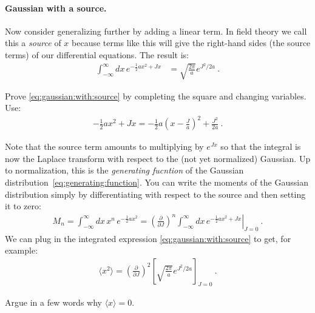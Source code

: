 \paragraph{Gaussian with a source.} Now consider generalizing further by adding a linear term. In field theory we call this a \emph{source} of $x$ because terms like this will give the right-hand sides (the source terms) of our differential equations. The result is:
\begin{align}
	\int_{-\infty}^{\infty}dx\, e^{-\frac{1}{2}ax^2 + Jx}
	&=
	\sqrt{\frac{2\pi}{a}}  e^{J^2/2a} \ .
	\label{eq:gaussian:with:source}
\end{align}
\begin{exercise}
Prove \eqref{eq:gaussian:with:source} by completing the square and changing variables. Use:
\begin{align}
	-\frac{1}{2}ax^2 + Jx = -\frac{1}{2}a\left(x-\frac{J}{a}\right)^2 + \frac{J^2}{2a} \ .
\end{align}
\end{exercise}

Note that the source term amounts to multiplying by $e^{Jx}$ so that the integral is now the Laplace transform with respect to the (not yet normalized) Gaussian. Up to normalization, this is the \emph{generating fucntion} of the Gaussian distribution~\eqref{eq:generating:function}. You can write the moments of the Gaussian distribution simply by differentiating with respect to the source and then setting it to zero:
\begin{align}
	M_n 
	= 
	\int_{-\infty}^{\infty}dx\, x^n\,  e^{-\frac{1}{2}ax^2} 
	= 
	\left.
	\left(\frac{\partial}{\partial J}\right)^n \int_{-\infty}^{\infty}dx\, e^{-\frac{1}{2}ax^2 + Jx}
	\right|_{J=0}
	\ .
	\label{eq:gaussian:moments}
\end{align}
We can plug in the integrated expression \eqref{eq:gaussian:with:source} to get, for example:
\begin{align}
	\langle x^2 \rangle = 
	\left(\frac{\partial}{\partial J}\right)^2
	\left[\sqrt{\frac{2\pi}{a}}  e^{J^2/2a}\right]_{J=0} \ .
\end{align}
\begin{exercise}
Argue in a few words why $\langle x \rangle = 0$.
\end{exercise}

